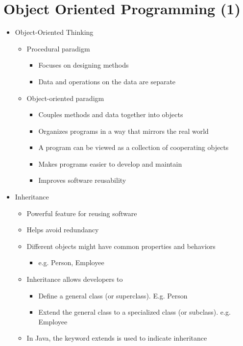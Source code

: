 \documentclass[11pt]{article}
\begin{document}
\newpage

\section{Object Oriented Programming (1)}
\begin{itemize}
	\item Object-Oriented Thinking
		\begin{itemize}
			\item Procedural paradigm
				\begin{itemize}
					\item Focuses on designing methods
					\item Data and operations on the data are separate
				\end{itemize}
			\item Object-oriented paradigm
				\begin{itemize}
					\item Couples methods and data together into objects
					\item Organizes programs in a way that mirrors the real world
					\item A program can be viewed as a collection of cooperating objects
					\item Makes programs easier to develop and maintain
					\item Improves software reusability
				\end{itemize}
		\end{itemize}

	\item Inheritance
		\begin{itemize}
			\item Powerful feature for reusing software
			\item Helps avoid redundancy
			\item Different objects might have common properties and behaviors
				\begin{itemize}
					\item e.g. Person, Employee
				\end{itemize}
			\item Inheritance allows developers to
				\begin{itemize}
					\item Define a general class (or superclass). E.g. Person
					\item Extend the general class to a specialized class (or subclass). e.g. Employee
				\end{itemize}
			\item In Java, the keyword extends is used to indicate inheritance
		\end{itemize}


\end{itemize}
\end{document}
